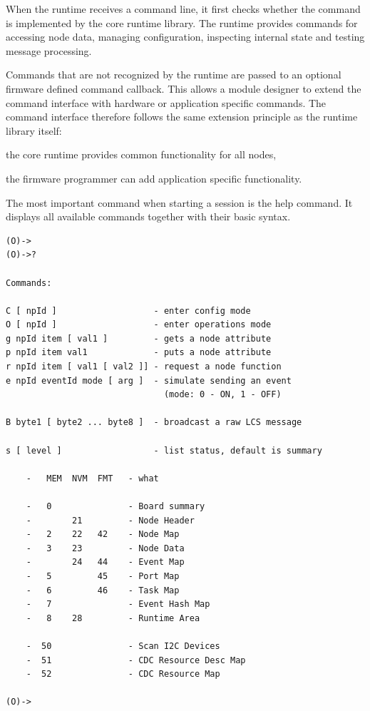 
When the runtime receives a command line, it first checks whether the command is
implemented by the core runtime library. The runtime provides commands for accessing
node data, managing configuration, inspecting internal state and testing message
processing.

Commands that are not recognized by the runtime are passed to an optional firmware
defined command callback. This allows a module designer to extend the command interface
with hardware or application specific commands.
The command interface therefore follows the same extension principle as the runtime
library itself:

\begin{smallGapItemize}
    \item the core runtime provides common functionality for all nodes,
    \item the firmware programmer can add application specific functionality.
\end{smallGapItemize}

The most important command when starting a session is the help command. It displays all
available commands together with their basic syntax.

\begin{lstlisting}[style=codesnippetstyle]
(O)->
(O)->?

Commands:

C [ npId ]                   - enter config mode
O [ npId ]                   - enter operations mode
g npId item [ val1 ]         - gets a node attribute
p npId item val1             - puts a node attribute
r npId item [ val1 [ val2 ]] - request a node function
e npId eventId mode [ arg ]  - simulate sending an event
                               (mode: 0 - ON, 1 - OFF)

B byte1 [ byte2 ... byte8 ]  - broadcast a raw LCS message

s [ level ]                  - list status, default is summary

    -   MEM  NVM  FMT   - what

    -   0               - Board summary
    -        21         - Node Header
    -   2    22   42    - Node Map
    -   3    23         - Node Data
    -        24   44    - Event Map
    -   5         45    - Port Map
    -   6         46    - Task Map
    -   7               - Event Hash Map
    -   8    28         - Runtime Area

    -  50               - Scan I2C Devices
    -  51               - CDC Resource Desc Map
    -  52               - CDC Resource Map

(O)->
\end{lstlisting}


